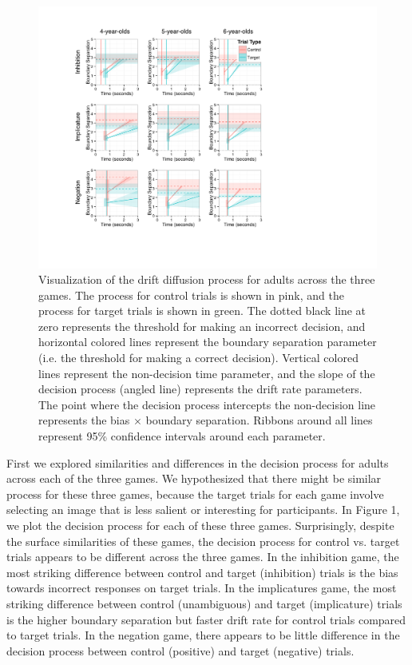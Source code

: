 \documentclass[10pt,letterpaper]{article}
\begin{document}
\begin{figure}
\begin{center} 
\includegraphics[width=6in]{figures/adult_vis.pdf}
\caption{\label{fig:adults} Visualization of the drift diffusion process for adults across the three games.  The process for control trials is shown in pink, and the process for target trials is shown in green.  The dotted black line at zero represents the threshold for making an incorrect decision, and horizontal colored lines represent the boundary separation parameter (i.e. the threshold for making a correct decision).  Vertical colored lines represent the non-decision time parameter, and the slope of the decision process (angled line) represents the drift rate parameters.  The point where the decision process intercepts the non-decision line represents the bias $\times$ boundary separation.  Ribbons around all lines represent 95\% confidence intervals around each parameter.}
\end{center} 
\end{figure}

First we explored similarities and differences in the decision process for adults across each of the three games.  We hypothesized that there might be similar process for these three games, because the target trials for each game involve selecting an image that is less salient or interesting for participants.  In Figure 1, we plot the decision process for each of these three games.  Surprisingly, despite the surface similarities of these games, the decision process for control vs. target trials appears to be different across the three games.  In the inhibition game, the most striking difference between control and target (inhibition) trials is the bias towards incorrect responses on target trials.  In the implicatures game, the most striking difference between control (unambiguous) and target (implicature) trials is the higher boundary separation but faster drift rate for control trials compared to target trials.  In the negation game, there appears to be little difference in the decision process between control (positive) and target (negative) trials.
\end{document}

